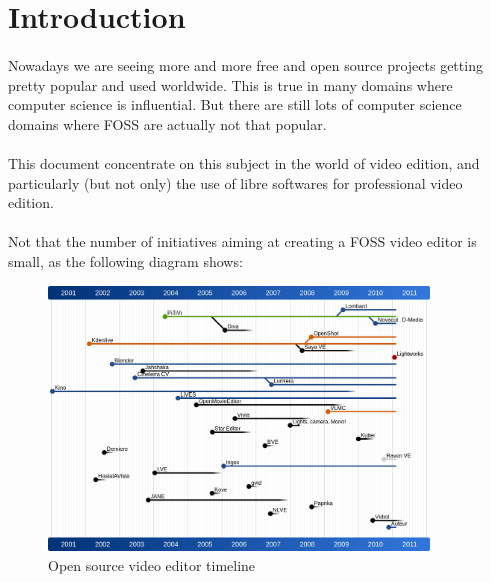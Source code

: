 \newpage
\section{Introduction}
    \paragraph{}
        Nowadays we are seeing more and more free and open source projects
        getting pretty popular and used worldwide. This is true in many
        domains where computer science is influential. But there are
        still lots of computer science domains where FOSS are actually not that
        popular.

    \paragraph{}
        This document concentrate on this subject in the world of video
        edition, and particularly (but not only) the use of libre softwares
        for professional video edition.

    \paragraph{}
        Not that the number of initiatives aiming at creating a FOSS video
        editor is small, as the following diagram shows:

        \begin{figure}[!htbp]
            \begin{center}
                \includegraphics[width=0.9\textwidth]{images/open-source-video-editor-timeline}
            \end{center}
            \caption{Open source video editor timeline}
            \label{Yes}
        \end{figure}

